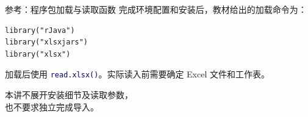 \documentclass[14pt,compress,t,noamsthm,notheorem,table,handout,fontset=none]{ctexbeamer}
\newcommand{\code}[1]{\textcolor{navy}{\texttt{#1}}}
\begin{document}
\begin{frame}[fragile]{参考：程序包加载与读取函数}
  完成环境配置和安装后，教材给出的加载命令为：
\begin{lstlisting}
library("rJava")
library("xlsxjars")
library("xlsx")
\end{lstlisting}
  \medskip
  加载后使用 \code{read.xlsx()}。实际读入前需要确定 Excel 文件和工作表。
  \par\medskip
  本讲不展开安装细节及读取参数，\\
  也不要求独立完成导入。
\end{frame}
\end{document}
